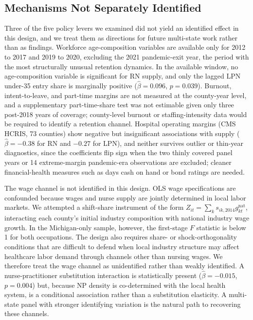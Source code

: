 \documentclass[12pt]{article}
\begin{document}
\subsection{Mechanisms Not Separately Identified}

Three of the five policy levers we examined did not yield an identified
effect in this design, and we treat them as directions for future
multi-state work rather than as findings. Workforce age-composition
variables are available only for 2012 to 2017 and 2019 to 2020, excluding
the 2021 pandemic-exit year, the period with the most structurally unusual
retention dynamics. In the available window, no age-composition variable is
significant for RN supply, and only the lagged LPN under-35 entry share is
marginally positive ($\hat{\beta} = 0.096$, $p = 0.039$). Burnout,
intent-to-leave, and part-time margins are not measured at the county-year
level, and a supplementary part-time-share test was not estimable given
only three post-2018 years of coverage; county-level burnout or
staffing-intensity data would be required to identify a retention channel.
Hospital operating margins (CMS HCRIS, 73 counties) show negative but
insignificant associations with supply ($\hat{\beta} = -0.38$ for RN and
$-0.27$ for LPN), and neither survives outlier or thin-year diagnostics,
since the coefficients flip sign when the two thinly covered panel years or
14 extreme-margin pandemic-era observations are excluded; cleaner
financial-health measures such as days cash on hand or bond ratings are
needed.

The wage channel is not identified in this design. OLS wage specifications
are confounded because wages and nurse supply are jointly determined in
local labor markets. We attempted a shift-share instrument of the form
$Z_{it}=\sum_k s_{ik,2014} g^{\text{nat}}_{kt}$, interacting each
county's initial industry composition with national industry wage growth.
In the Michigan-only sample, however, the first-stage $F$ statistic is
below 1 for both occupations. The design also requires share- or
shock-orthogonality conditions \citep{borusyak2022quasi,goldsmith2020bartik}
that are difficult to defend when local industry structure may affect
healthcare labor demand through channels other than nursing wages. We
therefore treat the wage channel as unidentified rather than weakly
identified. A nurse-practitioner substitution interaction is
statistically present ($\hat{\beta} = -0.015$, $p = 0.004$) but, because NP
density is co-determined with the local health system, is a conditional
association rather than a substitution elasticity. A multi-state panel with
stronger identifying variation is the natural path to recovering these
channels.
\end{document}
